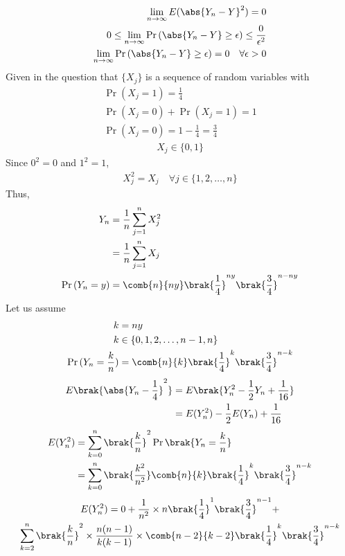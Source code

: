 \begin{align}
    \lim_{n\rightarrow \infty} E(\abs{Y_n-Y}^2) = 0 
    \\0 \leq  \lim_{n\rightarrow \infty}\Pr{(\abs{Y_n-Y}\geq \epsilon)}  \leq \frac{0}{\epsilon^2}
    \\   \lim_{n\rightarrow \infty}\Pr{(\abs{Y_n-Y}\geq \epsilon)} = 0 \quad \forall \epsilon >0
\end{align}
Given in the question that $\{X_j\}$ is a sequence of random variables with
\begin{align}
    \Pr{(X_j=1)} = \frac{1}{4}
    \\\Pr{(X_j=0)} + \Pr{(X_j=1)} = 1
    \\\Pr{(X_j=0)} = 1 - \frac{1}{4} = \frac{3}{4}
\end{align}
\begin{align}
    X_j \in \{0,1\} 
\end{align}
Since $0^2 = 0$ and $1^2 = 1$, 
\begin{align}
    X_j^2 = X_j \quad \forall j \in \{1, 2,\hdots, n\}
\end{align}
Thus, 
\begin{align}
    Y_n &= \frac{1}{n} \sum_{j=1}^{n}X_j^2 
    \\&= \frac{1}{n} \sum_{j=1}^{n}X_j
    \\\Pr{(Y_n = y)} &= \comb{n}{ny} \brak{\frac{1}{4}}^{ny} \brak{\frac{3}{4}}^{n-ny}
\end{align}
Let us assume
\begin{align}
    k &= ny
    \\k &\in \{0,1,2,\hdots,n-1,n\}
    \\ \Pr{(Y_n = \frac{k}{n})} &= \comb{n}{k} \brak{\frac{1}{4}}^{k} \brak{\frac{3}{4}}^{n-k}
\end{align}
\begin{align}
    E\brak{\abs{Y_n-\frac{1}{4}}^2} &= E\brak{Y_n^2 - \frac{1}{2}Y_n + \frac{1}{16}}
    \\&= E(Y_n^2) - \frac{1}{2}E(Y_n) + \frac{1}{16} \label{ma2018-25:equation 0}
\end{align}
\begin{align}
    E(Y_n^2) &= \sum_{k=0}^n\brak{\frac{k}{n}}^2\Pr{\brak{Y_n=\frac{k}{n}}}
    \\&= \sum_{k=0}^{n} \brak{\frac{k^2}{n^2}}\comb{n}{k} \brak{\frac{1}{4}}^{k} \brak{\frac{3}{4}}^{n-k}
\end{align}
\begin{multline}
    E(Y_n^2) = 0 + \frac{1}{n^2}\times n\brak{\frac{1}{4}}^{1} \brak{\frac{3}{4}}^{n-1} + \\\sum_{k=2}^{n} \brak{\frac{k}{n}}^2\times\frac{n(n-1)}{k(k-1)}
    \times\comb{n-2}{k-2}\brak{\frac{1}{4}}^{k} \brak{\frac{3}{4}}^{n-k}
\end{multline}
